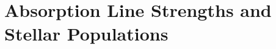 \documentclass[fleqn,usenatbib,useAMS]{mnras}
\begin{document}






\section{Absorption Line Strengths and Stellar Populations}
	\label{sec:stellarPop}

\end{document}
